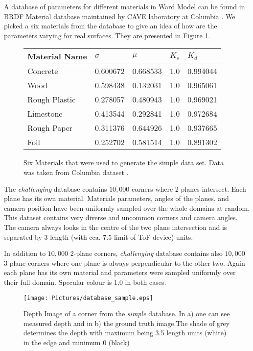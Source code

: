 \documentclass[11pt,twocolumn]{article}
\begin{document}
A database of parameters for different materials in Ward Model can be found in BRDF Material database maintained by CAVE laboratory at Columbia \cite{CAVEdat}. We picked a six materials from the database to give an idea of how are the parameters varying for real surfaces. They are presented in Figure \ref{fig:Materials_table}.
 
\begin{figure}
\centering
\begin{tabular}{ | l | l | l | l | l |}
    \hline
    Material Name & $\sigma$ & $\mu$ & $K_s$ & $K_d$ \\ \hline
     
	Concrete & 0.600672& 0.668533& 1.0& 0.994044 \\ \hline
	Wood& 0.598438& 0.132031& 1.0 & 0.965061\\ \hline
	Rough Plastic& 0.278057& 0.480943 & 1.0 & 0.969021 \\ \hline
	Limestone& 0.413544 & 0.292841 & 1.0 & 0.972684 \\ \hline
	Rough Paper& 0.311376 & 0.644926 & 1.0  & 0.937665 \\ \hline
	Foil & 0.252702 & 0.581514 & 1.0 & 0.891302 \\ \hline

\end{tabular}
\caption{Six Materials that were used to generate the simple data set. Data was taken from Columbia dataset \cite{CAVEdat}.} 
\label{fig:Materials_table}
\end{figure}

The \textit{challenging} database contains $10,000$ corners where 2-planes intersect. Each plane has its own material. Materials parameters, angles of the planes, and camera position have been uniformly sampled over the whole domains at random. This dataset contains very diverse and uncommon corners and camera angles. The camera always looks in the centre of the two plane intersection and is separated by 3 length (with cca. 7.5 limit of ToF device) units.

In addition to $10,000$ 2-plane corners, \textit{challenging} database contains also $10,000$ 3-plane corners where one plane is always perpendicular to the other two. Again each plane has its own material and parameters were sampled uniformly over their full domain. Specular colour is $1.0$ in both cases.

\begin{figure}
    \centering
    \texttt{[image: Pictures/database\_sample.eps]}
    \caption{Depth Image of a corner from the \emph{simple} database. In a) one can see measured depth and in b) the ground truth image.The shade of grey determines the depth with maximum being 3.5 length units (white) in the edge and minimum 0 (black)}
    \label{fig:database sample}
\end{figure}
\end{document}
